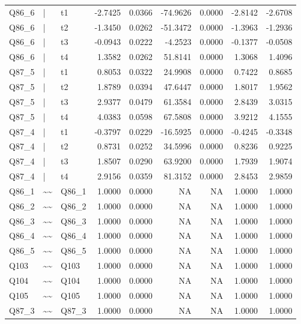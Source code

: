 \begin{longtable}{lllrrrrrr}
Q86\_6 & | & t1 & -2.7425 & 0.0366 & -74.9626 & 0.0000 & -2.8142 & -2.6708\\
Q86\_6 & | & t2 & -1.3450 & 0.0262 & -51.3472 & 0.0000 & -1.3963 & -1.2936\\
\addlinespace
Q86\_6 & | & t3 & -0.0943 & 0.0222 & -4.2523 & 0.0000 & -0.1377 & -0.0508\\
Q86\_6 & | & t4 & 1.3582 & 0.0262 & 51.8141 & 0.0000 & 1.3068 & 1.4096\\
Q87\_5 & | & t1 & 0.8053 & 0.0322 & 24.9908 & 0.0000 & 0.7422 & 0.8685\\
Q87\_5 & | & t2 & 1.8789 & 0.0394 & 47.6447 & 0.0000 & 1.8017 & 1.9562\\
Q87\_5 & | & t3 & 2.9377 & 0.0479 & 61.3584 & 0.0000 & 2.8439 & 3.0315\\
\addlinespace
Q87\_5 & | & t4 & 4.0383 & 0.0598 & 67.5808 & 0.0000 & 3.9212 & 4.1555\\
Q87\_4 & | & t1 & -0.3797 & 0.0229 & -16.5925 & 0.0000 & -0.4245 & -0.3348\\
Q87\_4 & | & t2 & 0.8731 & 0.0252 & 34.5996 & 0.0000 & 0.8236 & 0.9225\\
Q87\_4 & | & t3 & 1.8507 & 0.0290 & 63.9200 & 0.0000 & 1.7939 & 1.9074\\
Q87\_4 & | & t4 & 2.9156 & 0.0359 & 81.3152 & 0.0000 & 2.8453 & 2.9859\\
\addlinespace
Q86\_1 & \textasciitilde{}\textasciitilde{} & Q86\_1 & 1.0000 & 0.0000 & NA & NA & 1.0000 & 1.0000\\
Q86\_2 & \textasciitilde{}\textasciitilde{} & Q86\_2 & 1.0000 & 0.0000 & NA & NA & 1.0000 & 1.0000\\
Q86\_3 & \textasciitilde{}\textasciitilde{} & Q86\_3 & 1.0000 & 0.0000 & NA & NA & 1.0000 & 1.0000\\
Q86\_4 & \textasciitilde{}\textasciitilde{} & Q86\_4 & 1.0000 & 0.0000 & NA & NA & 1.0000 & 1.0000\\
Q86\_5 & \textasciitilde{}\textasciitilde{} & Q86\_5 & 1.0000 & 0.0000 & NA & NA & 1.0000 & 1.0000\\
\addlinespace
Q103 & \textasciitilde{}\textasciitilde{} & Q103 & 1.0000 & 0.0000 & NA & NA & 1.0000 & 1.0000\\
Q104 & \textasciitilde{}\textasciitilde{} & Q104 & 1.0000 & 0.0000 & NA & NA & 1.0000 & 1.0000\\
Q105 & \textasciitilde{}\textasciitilde{} & Q105 & 1.0000 & 0.0000 & NA & NA & 1.0000 & 1.0000\\
Q87\_3 & \textasciitilde{}\textasciitilde{} & Q87\_3 & 1.0000 & 0.0000 & NA & NA & 1.0000 & 1.0000\\

\end{longtable}
